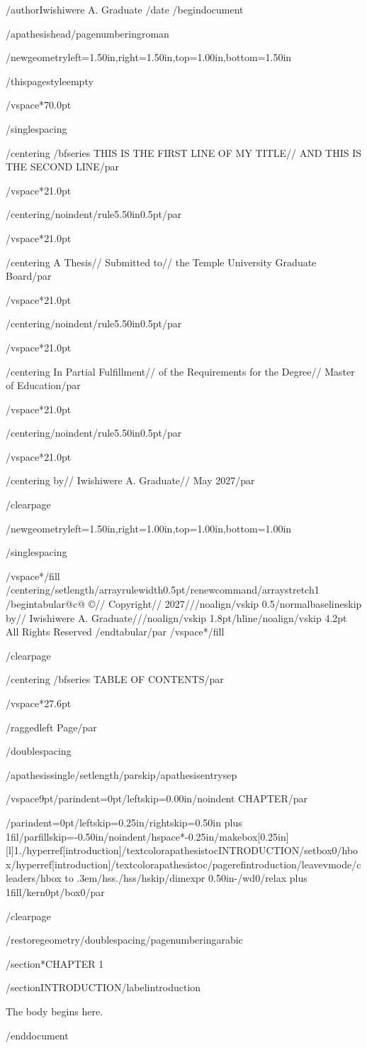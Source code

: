 /author{Iwishiwere A. Graduate}
/date{}
/begin{document}


/apathesishead/pagenumbering{roman}

/newgeometry{left=1.50in,right=1.50in,top=1.00in,bottom=1.50in}

/thispagestyle{empty}

/vspace*{70.0pt}

/singlespacing

{/centering
/bfseries THIS IS THE FIRST LINE OF MY TITLE//
AND THIS IS THE SECOND LINE/par}

/vspace*{21.0pt}

{/centering/noindent/rule{5.50in}{0.5pt}/par}

/vspace*{21.0pt}

{/centering
A Thesis//
Submitted to//
the Temple University Graduate Board/par}

/vspace*{21.0pt}

{/centering/noindent/rule{5.50in}{0.5pt}/par}

/vspace*{21.0pt}

{/centering
In Partial Fulfillment//
of the Requirements for the Degree//
Master of Education/par}

/vspace*{21.0pt}

{/centering/noindent/rule{5.50in}{0.5pt}/par}

/vspace*{21.0pt}

{/centering
by//
Iwishiwere A. Graduate//
May 2027/par}

/clearpage

/newgeometry{left=1.50in,right=1.00in,top=1.00in,bottom=1.00in}

/singlespacing

/vspace*{/fill}
{/centering/setlength{/arrayrulewidth}{0.5pt}/renewcommand{/arraystretch}{1}
/begin{tabular}{@{}c@{}}
©//
Copyright//
2027///noalign{/vskip 0.5/normalbaselineskip}
by//
Iwishiwere A. Graduate///noalign{/vskip 1.8pt}/hline/noalign{/vskip 4.2pt}
All Rights Reserved
/end{tabular}/par}
/vspace*{/fill}

/clearpage

{/centering
/bfseries TABLE OF CONTENTS/par}

/vspace*{27.6pt}

{/raggedleft
Page/par}

/doublespacing

{/apathesissingle/setlength{/parskip}{/apathesisentrysep}

/vspace{9pt}{/parindent=0pt/leftskip=0.00in/noindent CHAPTER/par}

{/parindent=0pt/leftskip=0.25in/rightskip=0.50in plus 1fil/parfillskip=-0.50in/noindent/hspace*{-0.25in}/makebox[0.25in][l]{1.}/hyperref[introduction]{/textcolor{apathesistoc}{INTRODUCTION}}/setbox0/hbox{/hyperref[introduction]{/textcolor{apathesistoc}{/pageref{introduction}}}}/leavevmode/cleaders/hbox to .3em{/hss./hss}/hskip/dimexpr 0.50in-/wd0/relax plus 1fill/kern0pt/box0/par}

}

/clearpage

/restoregeometry/doublespacing/pagenumbering{arabic}

/section*{CHAPTER 1}

/section{INTRODUCTION}/label{introduction}

The body begins here.




/end{document}
